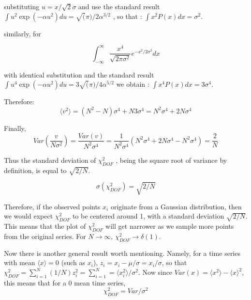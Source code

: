 \documentclass[fleqn,usenatbib]{mnras}  %
\begin{document}
substituting $u = x / \sqrt{2} \sigma$ and use the standard result  $\int u^{2} \exp(-\alpha u^{2})du = \sqrt(\pi)/2\alpha^{3/2}$ , so that :   $\int x^{2} P(x) dx = \sigma^{2}$. 

similarly, for 

\begin{equation}
\int_{-\infty}^{\infty} \frac{x^{4}}{\sqrt{2\pi \sigma^{2}}} e^{-x^{2} / 2 \sigma^{2}} dx 
\end{equation}

with identical substitution and the standard result  $\int u^{4} \exp(-\alpha u^{2})du =3 \sqrt(\pi)/4\alpha^{5/2}$ we obtain : $\int x^{4} P(x) dx = 3 \sigma^{4}$.  

Therefore:
\begin{equation}
\langle v^{2} \rangle = (N^{2}-N) \sigma^{4} + N 3\sigma^{4} = N^{2}\sigma^{4} + 2N\sigma^{4}
\end{equation}

Finally, 
\begin{equation}
\label{eq:chi2_variance}
Var\left(\frac{v}{N \sigma^{2}}\right) = \frac{Var(v)}{N^{2} \sigma^{4}}  = \frac{1}{N^{2}\sigma^{4}}(N^{2}\sigma^{4} + 2N\sigma^{4}-N^{2}\sigma^{4}) = \frac{2}{N}
\end{equation}

Thus the standard deviation of $\chi^{2}_{DOF}$ , being the square root of variance by definition, is equal to $\sqrt{2/N}$. 

\begin{equation}
\label{eq:chi2_stdev}
\sigma\left( \chi^{2}_{DOF} \right) = \sqrt{2/N}
\end{equation}

Therefore, if the observed points ${x_{i}}$ originate from a Gaussian distribution, then we would expect  $\chi^{2}_{DOF}$  to be centered around 1,  with a standard deviation  $\sqrt{2/N}$. This means that the plot of $\chi^{2}_{DOF}$ will get narrower as we sample more points from the original series.  For $N \to \infty$,  $\chi^{2}_{DOF} \to \delta(1)$.    

Now there is another general result worth mentioning. Namely, for a time series with mean $\langle x \rangle = 0$  (such as $x_{i}$), $z_{i} = x_{i} - \mu / \sigma = x_{i} / \sigma$, so that   $\chi^{2}_{DOF} = \sum_{i=1}^{N}{(1/N) z_{i}^{2}} = \sum_{i=1}^{N} = \langle x_{i} ^{2} \rangle / \sigma^{2}$. Now since $Var(x) = \langle x^{2} \rangle - \langle x \rangle ^{2}$, this means that for a $0$ mean time series, 
\begin{equation}
\label{eq:chi2_and_variance}
\chi^{2}_{DOF} = Var / \sigma^{2}
\end{equation}
\end{document}
